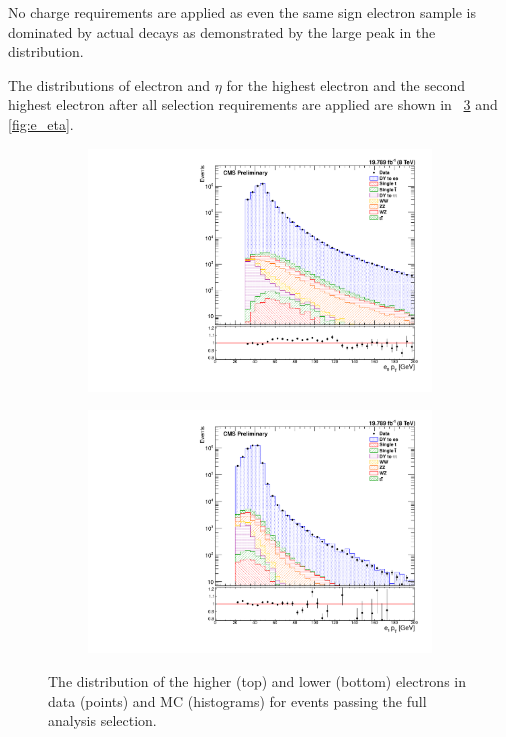 No charge requirements are applied as even the same sign electron sample is
dominated by actual \Z decays as demonstrated by the large peak in the \mee
distribution.

The distributions of electron \pt and $\eta$ for the highest \pt electron and
the second highest \pt electron after all selection requirements are applied
are shown in \FIGS~\ref{fig:e_pt} and \ref{fig:e_eta}.

\begin{figure}[tb]
    \centering
    \begin{subfigure}[b]{0.65\textwidth}
        \includegraphics[width=\textwidth]{figures/e0_pt.pdf}
        \caption{}
        \label{fig:e_pt_high}
    \end{subfigure}
    \begin{subfigure}[b]{0.65\textwidth}
        \includegraphics[width=\textwidth]{figures/e1_pt.pdf}
        \caption{}
        \label{fig:e_pt_low}
    \end{subfigure}
    \caption{
        The \pt distribution of the higher (top) and lower (bottom) \pt
        electrons in data (points) and MC (histograms) for events passing the
        full analysis selection.
    }
    \label{fig:e_pt}
\end{figure}

